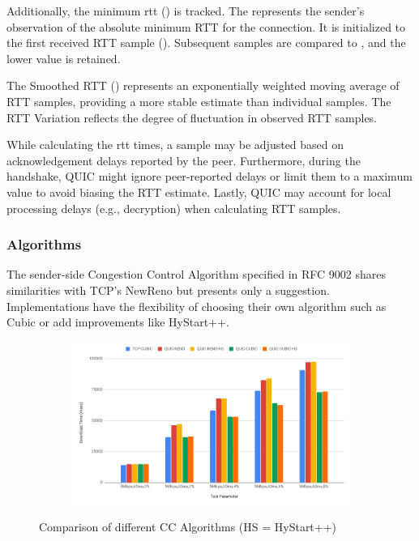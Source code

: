 Additionally, the minimum rtt () is tracked. The  represents the sender's observation of the absolute
minimum RTT for the connection. It is initialized to the first received RTT sample (). Subsequent samples are compared
to , and the lower value is retained.

The Smoothed RTT () represents an exponentially weighted moving average of RTT samples, providing a more stable
estimate than individual samples. The RTT Variation  reflects the degree of fluctuation in observed RTT samples.


While calculating the rtt times, a sample may be adjusted based on acknowledgement delays reported by the peer. Furthermore, during the
handshake, QUIC might ignore peer-reported delays or limit them to a maximum value to avoid
biasing the RTT estimate. Lastly, QUIC may account for local processing delays (e.g., decryption) when calculating RTT samples.

\subsubsection{Algorithms}

The sender-side Congestion Control Algorithm specified in RFC 9002\cite[17]{rfc9002} shares similarities with TCP's
NewReno\cite[]{rfc6582} but presents only a suggestion. Implementations have the flexibility of choosing their own algorithm such as
Cubic\cite[]{rfc8312} or add improvements like HyStart++\cite[]{rfc9406}.

\begin{figure}[h]
    \centering
    \begin{subfigure}[b]{1.0\textwidth}
      \includegraphics[width=1.0\linewidth]{img/cc}
    \end{subfigure}
    \caption{Comparison of different CC Algorithms (HS = HyStart++) \cite[]{ccgraphic}}
    \label{cc_comparison}
\end{figure}

